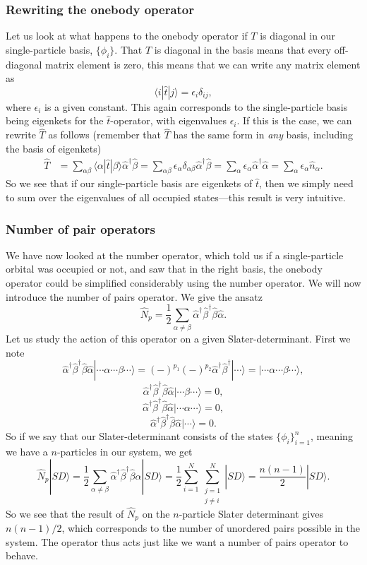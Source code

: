 \documentclass[a4paper, 11pt, notitlepage, english]{article}
\newcommand{\ket}[1]{|#1 \rangle}
\newcommand{\op}[1]{\hat{#1}}
\newcommand{\braopket}[3]{\langle #1 | {#2} | #3 \rangle}
\newcommand{\eps}{\epsilon}
\begin{document}
\subsubsection*{Rewriting the onebody operator}

Let us look at what happens to the onebody operator if $T$ is diagonal in our single-particle basis, $\{\phi_i\}$. That $T$ is diagonal in the basis means that every off-diagonal matrix element is zero, this means that we can write any matrix element as
$$\braopket{i}{\op{t}}{j} = \eps_i \delta_{ij},$$
where $\eps_i$ is a given constant. This again corresponds to the single-particle basis being eigenkets for the $\op{t}$-operator, with eigenvalues $\eps_i$. If this is the case, we can rewrite $\op{T}$ as follows (remember that $\op{T}$ has the same form in \emph{any} basis, including the basis of eigenkets)
\begin{align*}
\op{T} &= \sum_{\alpha \beta} \braopket{\alpha}{\op{t}}{\beta} \op{\alpha}^\dag \op{\beta} 
= \sum_{\alpha \beta} \eps_\alpha \delta_{\alpha\beta} \op{\alpha}^\dag \op{\beta} 
= \sum_{\alpha} \eps_\alpha \op{\alpha}^\dag \op{\alpha} 
= \sum_{\alpha} \eps_\alpha \op{n}_\alpha.
\end{align*}
So we see that if our single-particle basis are eigenkets of $\op{t}$, then we simply need to sum over the eigenvalues of all occupied states---this result is very intuitive.

\subsubsection*{Number of pair operators}
We have now looked at the number operator, which told us if a single-particle orbital was occupied or not, and saw that in the right basis, the onebody operator could be simplified considerably using the number operator. We will now introduce the number of pairs operator. We give the ansatz
$$\op{N}_p = \frac{1}{2}\sum_{\alpha \neq \beta} \op{\alpha}^\dag \op{\beta}^\dag \op{\beta} \op{\alpha}.$$
Let us study the action of this operator on a given Slater-determinant. First we note
$$\op{\alpha}^\dag  \op{\beta}^\dag \op{\beta} \op{\alpha} \ket{\cdots\alpha\cdots\beta\cdots} = (-)^{p_1}(-)^{p_2} \op{\alpha}^\dag  \op{\beta}^\dag \ket{\cdots} = \ket{\cdots\alpha\cdots\beta\cdots},$$
$$\op{\alpha}^\dag  \op{\beta}^\dag \op{\beta} \op{\alpha} \ket{\cdots\beta\cdots} = 0,$$
$$\op{\alpha}^\dag  \op{\beta}^\dag \op{\beta} \op{\alpha} \ket{\cdots\alpha\cdots} = 0,$$
$$\op{\alpha}^\dag  \op{\beta}^\dag \op{\beta} \op{\alpha} \ket{\cdots} = 0.$$
So if we say that our Slater-determinant consists of the states $\{\phi_i\}_{i=1}^n$, meaning we have a $n$-particles in our system, we get
$$\op{N}_p \ket{SD} = \frac{1}{2}\sum_{\alpha \neq \beta} \op{\alpha}^\dag \op{\beta}^\dag \op{\beta} \op{\alpha}\ket{SD} = \frac{1}{2} \sum_{i=1}^N \sum_{\substack{j=1 \\ j\neq i}}^N \ket{SD} = \frac{n(n-1)}{2}\ket{SD}.$$
So we see that the result of $\op{N}_p$ on the $n$-particle Slater determinant gives $n(n-1)/2$, which corresponds to the number of unordered pairs possible in the system. The operator thus acts just like we want a number of pairs operator to behave.
\end{document}
